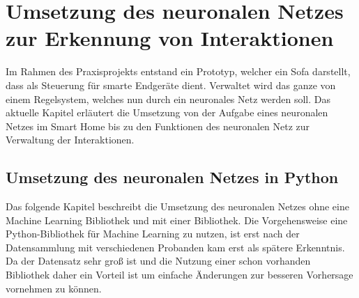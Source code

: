 \chapter{Umsetzung des neuronalen Netzes zur Erkennung von Interaktionen}
Im Rahmen des Praxisprojekts entstand ein Prototyp, welcher ein Sofa darstellt, dass als Steuerung für smarte Endgeräte dient. Verwaltet wird das ganze von einem Regelsystem, welches nun durch ein neuronales Netz werden soll. Das aktuelle Kapitel erläutert die Umsetzung von der Aufgabe eines neuronalen Netzes im Smart Home bis zu den Funktionen des neuronalen Netz zur Verwaltung der Interaktionen.

\section{Umsetzung des neuronalen Netzes in Python}
\label{sec:ums_nn}
Das folgende Kapitel beschreibt die Umsetzung des neuronalen Netzes ohne eine Machine Learning Bibliothek und mit einer Bibliothek. Die Vorgehensweise eine Python-Bibliothek für Machine Learning zu nutzen, ist erst nach der Datensammlung mit verschiedenen Probanden kam erst als spätere Erkenntnis. Da der Datensatz sehr groß ist und die Nutzung einer schon vorhanden Bibliothek daher ein Vorteil ist um einfache Änderungen zur besseren Vorhersage vornehmen zu können.

